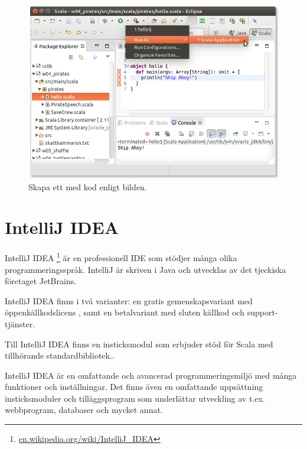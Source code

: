 \begin{enumerate}
\begin{figure}[H]
\centering
\includegraphics[width=1.0\textwidth]{../img/eclipse/eclipse-pirates-hello.png} 
\caption {Skapa ett  med kod enligt bilden.}
\label{fig:eclipse:pirates-hi}
\end{figure}


\end{enumerate}



\newpage

\section{IntelliJ IDEA}\label{appendix:ide:intellij}

IntelliJ IDEA%
\footnote{\href{https://en.wikipedia.org/wiki/IntelliJ_IDEA}{en.wikipedia.org/wiki/IntelliJ\_IDEA}}
 är en professionell IDE som stödjer många olika programmeringsspråk. IntelliJ är skriven i Java och utvecklas av det tjeckiska företaget JetBrains. 

IntelliJ IDEA finns i två varianter: en gratis gemenskapsvariant med öppenkällkodslicens , samt en betalvariant med sluten källkod och support-tjänster.


Till IntelliJ IDEA finns en insticksmodul  som erbjuder stöd för Scala med tillhörande standardbibliotek..

IntelliJ IDEA är en omfattande och avancerad programmeringsmiljö med många funktioner och inställningar. Det finns även en omfattande uppsättning insticksmoduler och tilläggsprogram som underlättar utveckling av t.ex. webbprogram, databaser och mycket annat. 

